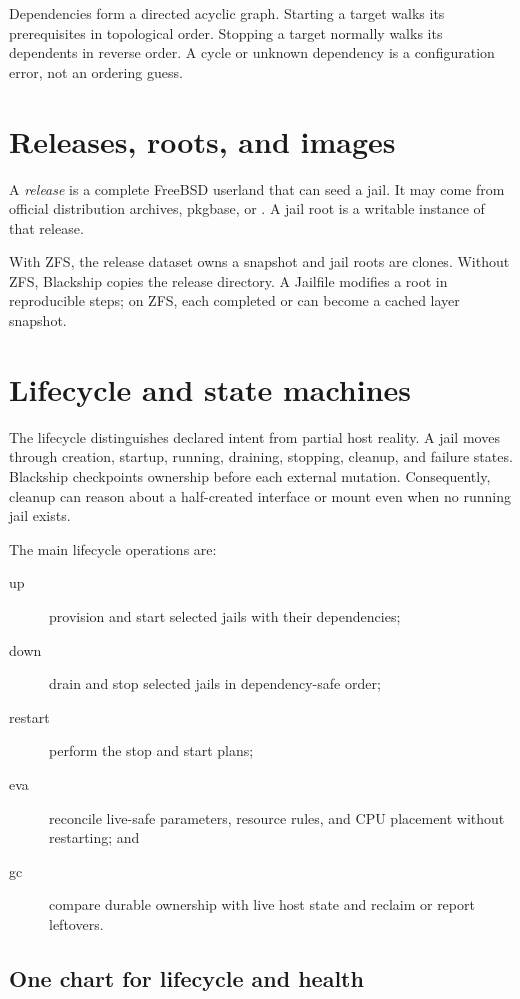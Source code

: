 Dependencies form a directed acyclic graph. Starting a target walks its
prerequisites in topological order. Stopping a target normally walks its
dependents in reverse order. A cycle or unknown dependency is a configuration
error, not an ordering guess.

\section{Releases, roots, and images}

A \emph{release} is a complete FreeBSD userland that can seed a jail. It may
come from official distribution archives, pkgbase, or . A jail root is a writable instance of that release.

With ZFS, the release dataset owns a  snapshot and jail
roots are clones. Without ZFS, Blackship copies the release directory. A
Jailfile modifies a root in reproducible steps; on ZFS, each completed
 or  can become a cached layer snapshot.

\section{Lifecycle and state machines}

The lifecycle distinguishes declared intent from partial host reality. A jail
moves through creation, startup, running, draining, stopping, cleanup, and
failure states. Blackship checkpoints ownership before each external mutation.
Consequently, cleanup can reason about a half-created interface or mount even
when no running jail exists.

The main lifecycle operations are:

\begin{description}
  \item[up] provision and start selected jails with their dependencies;
  \item[down] drain and stop selected jails in dependency-safe order;
  \item[restart] perform the stop and start plans;
  \item[eva] reconcile live-safe parameters, resource rules, and CPU placement
    without restarting; and
  \item[gc] compare durable ownership with live host state and reclaim or report
    leftovers.
\end{description}

\subsection*{One chart for lifecycle and health}

